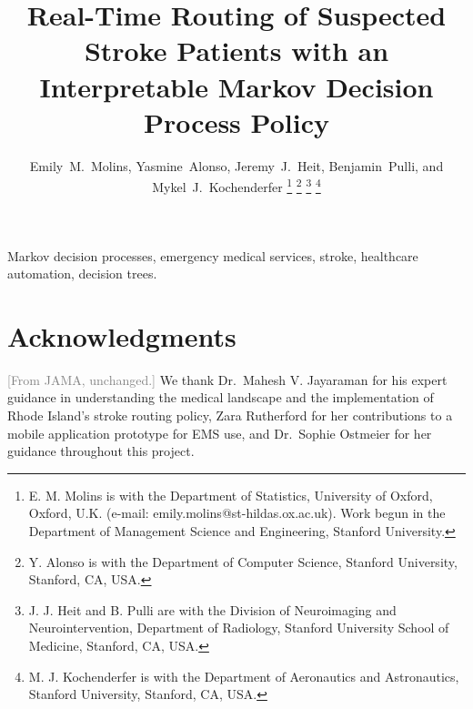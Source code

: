 \documentclass[lettersize,journal]{IEEEtran}
\newif\ifanon\anonfalse
\newcommand{\jama}[1]{\textcolor{gray}{\footnotesize[#1]}}
\newcommand{\jama}[1]{}
\begin{document}
\title{Real-Time Routing of Suspected Stroke Patients with an Interpretable Markov Decision Process Policy}

\ifanon
\author{Anonymous authors}
\else
\author{Emily~M.~Molins, Yasmine~Alonso, Jeremy~J.~Heit, Benjamin~Pulli, and Mykel~J.~Kochenderfer%
\thanks{E. M. Molins is with the Department of Statistics, University of Oxford, Oxford, U.K. (e-mail: emily.molins@st-hildas.ox.ac.uk). Work begun in the Department of Management Science and Engineering, Stanford University.}%
\thanks{Y. Alonso is with the Department of Computer Science, Stanford University, Stanford, CA, USA.}%
\thanks{J. J. Heit and B. Pulli are with the Division of Neuroimaging and Neurointervention, Department of Radiology, Stanford University School of Medicine, Stanford, CA, USA.}%
\thanks{M. J. Kochenderfer is with the Department of Aeronautics and Astronautics, Stanford University, Stanford, CA, USA.}}
\fi

\ifanon
\markboth{IEEE Transactions on Automation Science and Engineering}{Real-Time Routing of Suspected Stroke Patients}
\else
{}
\fi

\maketitle



\begin{IEEEkeywords}
Markov decision processes, emergency medical services, stroke, healthcare automation, decision trees.
\end{IEEEkeywords}










\ifanon\else
\section*{Acknowledgments}
\jama{From JAMA, unchanged.}
We thank Dr.~Mahesh V. Jayaraman for his expert guidance in understanding the medical landscape and the implementation of Rhode Island's stroke routing policy, Zara Rutherford for her contributions to a mobile application prototype for EMS use, and Dr.~Sophie Ostmeier for her guidance throughout this project.
\fi



\end{document}
